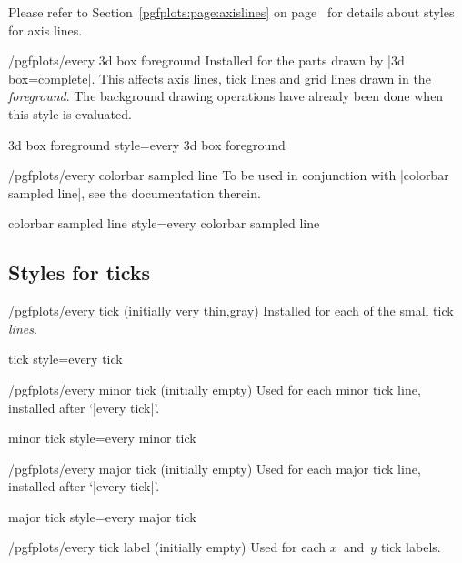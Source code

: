 \noindent Please refer to Section~\ref{pgfplots:page:axislines} on
page~\pageref{pgfplots:page:axislines} for details about styles for axis lines.

\begin{stylekey}{/pgfplots/every 3d box foreground}
    Installed for the parts drawn by |3d box=complete|. This affects axis
    lines, tick lines and grid lines drawn in the \emph{foreground}. The
    background drawing operations have already been done when this style is
    evaluated.
\end{stylekey}

\pgfplotsshortstylekey 3d box foreground style=every 3d box foreground\pgfeov

\begin{stylekey}{/pgfplots/every colorbar sampled line}
    To be used in conjunction with |colorbar sampled line|, see the
    documentation therein.
\end{stylekey}

\pgfplotsshortstylekey colorbar sampled line style=every colorbar sampled line\pgfeov


\subsection*{Styles for ticks}

\begin{stylekey}{/pgfplots/every tick (initially very thin,gray)}
    Installed for each of the small tick \emph{lines}.
\end{stylekey}

\pgfplotsshortstylekey tick style=every tick\pgfeov

\begin{stylekey}{/pgfplots/every minor tick (initially empty)}
    Used for each minor tick line, installed after `|every tick|'.
\end{stylekey}

\pgfplotsshortstylekey minor tick style=every minor tick\pgfeov

\begin{stylekey}{/pgfplots/every major tick (initially empty)}
    Used for each major tick line, installed after `|every tick|'.
\end{stylekey}

\pgfplotsshortstylekey major tick style=every major tick\pgfeov

\begin{stylekey}{/pgfplots/every tick label (initially empty)}
    Used for each $x$~and~$y$ tick labels.
\end{stylekey}

